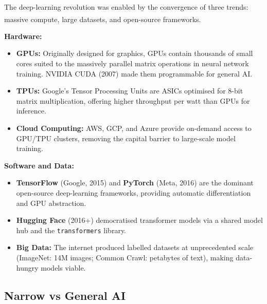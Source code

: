     \begin{tcbitemize}[ skin=sectionraster ]
        \tcbitem[title={Enablers of Modern AI: Hardware and Software}, raster multicolumn=6]
        The deep-learning revolution was enabled by the convergence of three trends: massive compute, large datasets, and open-source frameworks.\textsuperscript{\cite{adjaouteAI2024}}

        \textbf{Hardware:}
        \begin{itemize}
            \item \textbf{GPUs:} Originally designed for graphics, GPUs contain thousands of small cores suited to the massively parallel matrix operations in neural network training. NVIDIA CUDA (2007) made them programmable for general AI.
            \item \textbf{TPUs:} Google's Tensor Processing Units are ASICs optimised for 8-bit matrix multiplication, offering higher throughput per watt than GPUs for inference.
            \item \textbf{Cloud Computing:} AWS, GCP, and Azure provide on-demand access to GPU/TPU clusters, removing the capital barrier to large-scale model training.
        \end{itemize}

        \textbf{Software and Data:}
        \begin{itemize}
            \item \textbf{TensorFlow} (Google, 2015) and \textbf{PyTorch} (Meta, 2016) are the dominant open-source deep-learning frameworks, providing automatic differentiation and GPU abstraction.
            \item \textbf{Hugging Face} (2016+) democratised transformer models via a shared model hub and the \texttt{transformers} library.
            \item \textbf{Big Data:} The internet produced labelled datasets at unprecedented scale (ImageNet: 14M images; Common Crawl: petabytes of text), making data-hungry models viable.
        \end{itemize}
    \end{tcbitemize}

    \subsection{Narrow vs General AI}

